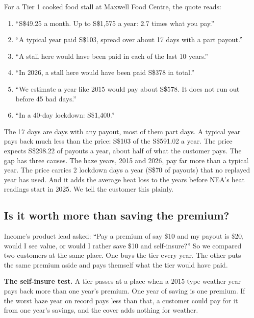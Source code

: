 \documentclass[11pt,a4paper]{article}
\newcommand{\sgd}{\textup{S\$}}
\begin{document}
For a Tier 1 cooked food stall at Maxwell Food Centre, the quote reads:

\begin{tcolorbox}[colback=soft,colframe=soft,arc=2pt,left=8pt,right=8pt,top=4pt,bottom=4pt]
\begin{enumerate}[leftmargin=1.4em,itemsep=0.2em,topsep=0.1em]
  \item ``\sgd 49.25 a month. Up to \sgd 1,575 a year: 2.7 times what you pay.''
  \item ``A typical year paid \sgd 103, spread over about 17 days with a part payout.''
  \item ``A stall here would have been paid in each of the last 10 years.''
  \item ``In 2026, a stall here would have been paid \sgd 378 in total.''
  \item ``We estimate a year like 2015 would pay about \sgd 578. It does not run out before 45 bad days.''
  \item ``In a 40-day lockdown: \sgd 1,400.''
\end{enumerate}
\end{tcolorbox}

The 17 days are days with any payout, most of them part days. A typical year pays back much less than the price: \sgd 103 of the \sgd 591.02 a year. The price expects \sgd 298.22 of payouts a year, about half of what the customer pays. The gap has three causes. The haze years, 2015 and 2026, pay far more than a typical year. The price carries 2 lockdown days a year (\sgd 70 of payouts) that no replayed year has used. And it adds the average heat loss to the years before NEA's heat readings start in 2025. We tell the customer this plainly.

\subsection{Is it worth more than saving the premium?}\label{sec:value}

Income's product lead asked: ``Pay a premium of say \$10 and my payout is \$20, would I see value, or would I rather save \$10 and self-insure?''\cite{income-qa} So we compared two customers at the same place. One buys the tier every year. The other puts the same premium aside and pays themself what the tier would have paid.

\textbf{The self-insure test.} A tier passes at a place when a 2015-type weather year pays back more than one year's premium. One year of saving is one premium. If the worst haze year on record pays less than that, a customer could pay for it from one year's savings, and the cover adds nothing for weather.
\end{document}
